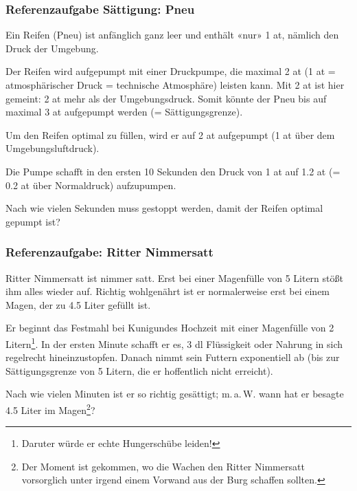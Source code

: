 \subsubsection{Referenzaufgabe Sättigung: Pneu}

Ein Reifen (Pneu) ist anfänglich ganz leer und enthält «nur» 1 at, nämlich den
Druck der Umgebung. 

Der Reifen wird aufgepumpt mit einer Druckpumpe, die maximal 2 at
(1 at = atmosphärischer Druck = technische Atmosphäre) leisten
kann. Mit 2 at ist hier gemeint: 2 at mehr als der
Umgebungsdruck. Somit könnte der Pneu bis auf maximal 3 at aufgepumpt
werden (= Sättigungsgrenze).

Um den Reifen optimal zu füllen, wird er auf 2 at aufgepumpt (1 at
über dem Umgebungsluftdruck).

Die Pumpe schafft in den ersten 10 Sekunden den Druck von 1 at auf 1.2
at (= 0.2 at über Normaldruck) aufzupumpen.

Nach wie vielen Sekunden muss gestoppt werden, damit der Reifen
optimal gepumpt ist?

\newpage

\subsubsection{Referenzaufgabe: Ritter
  Nimmersatt}
Ritter Nimmersatt ist nimmer satt. Erst bei einer Magenfülle von
5 Litern stößt ihm alles wieder auf. Richtig wohlgenährt ist er
normalerweise erst bei einem Magen, der zu 4.5 Liter gefüllt ist.

Er beginnt das Festmahl bei Kunigundes Hochzeit mit einer Magenfülle
von 2 Litern\footnote{Daruter würde er echte Hungerschübe
  leiden!}. In der ersten Minute schafft er es, 3 dl Flüssigkeit oder Nahrung
in sich regelrecht hineinzustopfen. Danach nimmt sein Futtern
exponentiell ab (bis zur Sättigungsgrenze von 5 Litern, die er
hoffentlich nicht erreicht).

Nach wie vielen Minuten ist er so richtig gesättigt; m.\,a.\,W. wann
hat er besagte 4.5 Liter im Magen\footnote{Der Moment ist gekommen, wo
  die Wachen den Ritter Nimmersatt vorsorglich unter irgend einem Vorwand aus der Burg schaffen sollten.}?

